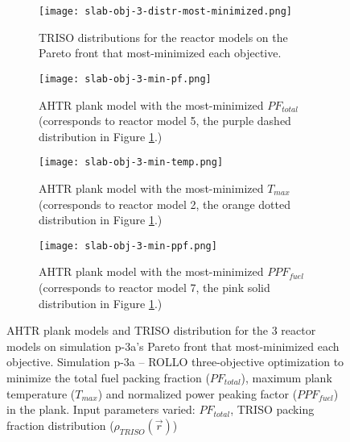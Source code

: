 \begin{figure}[htbp!]
    \centering
    \begin{subfigure}{0.85\textwidth}
        \texttt{[image: slab-obj-3-distr-most-minimized.png]}
        \caption{TRISO distributions for the reactor models on the Pareto front
        that most-minimized each objective.}
        \label{fig:slab-obj-3-distr-most-minimized}
    \end{subfigure}
    \begin{subfigure}{0.8\textwidth}
        \texttt{[image: slab-obj-3-min-pf.png]}
        \caption{\gls{AHTR} plank model with the most-minimized $PF_{total}$ 
        (corresponds to reactor model 5, the purple dashed distribution in 
        Figure \ref{fig:slab-obj-3-distr-most-minimized}.)}
        \label{fig:slab-obj-3-min-pf} 
    \end{subfigure}
    \begin{subfigure}{0.8\textwidth}
        \texttt{[image: slab-obj-3-min-temp.png]}
        \caption{\gls{AHTR} plank model with the most-minimized $T_{max}$
        (corresponds to reactor model 2, the orange dotted distribution in
        Figure \ref{fig:slab-obj-3-distr-most-minimized}.)}
        \label{fig:slab-obj-3-min-temp} 
    \end{subfigure}
    \begin{subfigure}{0.8\textwidth}
        \texttt{[image: slab-obj-3-min-ppf.png]}
        \caption{\gls{AHTR} plank model with the most-minimized $PPF_{fuel}$
        (corresponds to reactor model 7, the pink solid distribution in
        Figure \ref{fig:slab-obj-3-distr-most-minimized}.)}
        \label{fig:slab-obj-3-min-ppf} 
    \end{subfigure}
    \caption{AHTR plank models and TRISO distribution for the 3 reactor models on 
    simulation p-3a's Pareto front that most-minimized each objective.
    Simulation p-3a -- ROLLO three-objective optimization to minimize the total fuel 
    packing fraction ($PF_{total}$), maximum plank temperature ($T_{max}$) and 
    normalized power peaking factor ($PPF_{fuel}$) in the plank. 
    Input parameters varied: $PF_{total}$, TRISO packing fraction distribution
    ($\rho_{TRISO}(\vec{r})$)}
    \label{fig:slab-obj-3-most-minimized}
\end{figure}

